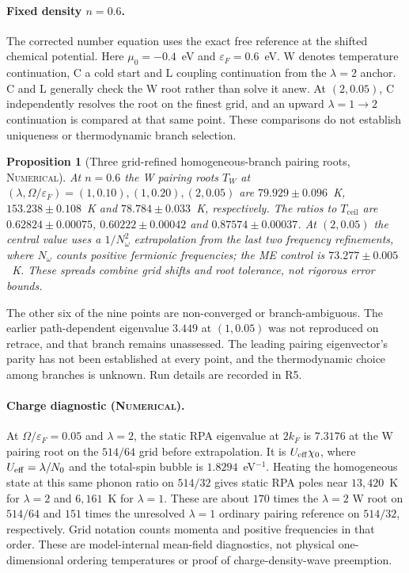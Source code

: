 \documentclass[11pt]{article}
\newcommand{\NUM}{\upshape\mdseries\textsc{Numerical}}
\newcommand{\Tceil}{T_{\mathrm{ceil}}}
\newtheorem{proposition}[theorem]{Proposition}
\theoremstyle{definition}
\theoremstyle{remark}
\begin{document}
\paragraph{Fixed density $n=0.6$.} The corrected number equation uses the exact free reference at the shifted chemical potential. Here $\mu_0=-0.4$~eV and $\varepsilon_F=0.6$~eV. W denotes temperature continuation, C a cold start and L coupling continuation from the $\lambda=2$ anchor. C and L generally check the W root rather than solve it anew. At $(2,0.05)$, C independently resolves the root on the finest grid, and an upward $\lambda=1\to2$ continuation is compared at that same point. These comparisons do not establish uniqueness or thermodynamic branch selection.

\begin{proposition}[Three grid-refined homogeneous-branch pairing roots, \NUM]\label{prop:lattice}
At $n=0.6$ the W pairing roots $T_W$ at $(\lambda,\Omega/\varepsilon_F)=(1,0.10),(1,0.20),(2,0.05)$ are $79.929\pm0.096$~K, $153.238\pm0.108$~K and $78.784\pm0.033$~K, respectively. The ratios to $\Tceil$ are $0.62824\pm0.00075$, $0.60222\pm0.00042$ and $0.87574\pm0.00037$. At $(2,0.05)$ the central value uses a $1/N_\omega^2$ extrapolation from the last two frequency refinements, where $N_\omega$ counts positive fermionic frequencies; the ME control is $73.277\pm0.005$~K. These spreads combine grid shifts and root tolerance, not rigorous error bounds.
\end{proposition}

The other six of the nine points are non-converged or branch-ambiguous. The earlier path-dependent eigenvalue $3.449$ at $(1,0.05)$ was not reproduced on retrace, and that branch remains unassessed. The leading pairing eigenvector's parity has not been established at every point, and the thermodynamic choice among branches is unknown. Run details are recorded in R5.

\paragraph{Charge diagnostic (\NUM).} At $\Omega/\varepsilon_F=0.05$ and $\lambda=2$, the static RPA eigenvalue at $2k_F$ is $7.3176$ at the W pairing root on the $514/64$ grid before extrapolation. It is $U_{\rm eff}\chi_0$, where $U_{\rm eff}=\lambda/N_0$ and the total-spin bubble is $1.8294$~eV$^{-1}$. Heating the homogeneous state at this same phonon ratio on $514/32$ gives static RPA poles near $13{,}420$~K for $\lambda=2$ and $6{,}161$~K for $\lambda=1$. These are about $170$ times the $\lambda=2$ W root on $514/64$ and $151$ times the unresolved $\lambda=1$ ordinary pairing reference on $514/32$, respectively. Grid notation counts momenta and positive frequencies in that order. These are model-internal mean-field diagnostics, not physical one-dimensional ordering temperatures or proof of charge-density-wave preemption.
\end{document}
